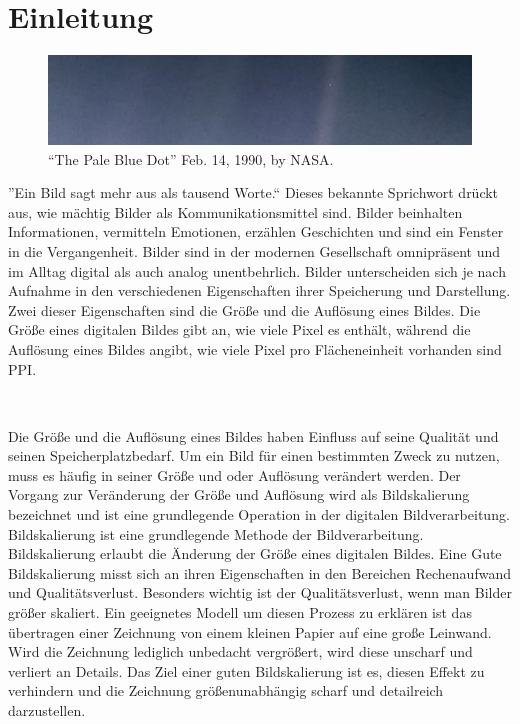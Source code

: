 



\chapter{Einleitung}
    
    \begin{center}
        \begin{figure}[h]
            \includegraphics[width=\textwidth]{img/PIA23645_PaleBlueDotRevisited_1600.jpg}
            \caption{``The Pale Blue Dot'' Feb. 14, 1990, by NASA\footnotemark.}
            \vspace{-6mm}
            \label{fig:my_label}
        \end{figure}
    \end{center}
    
    ''Ein Bild sagt mehr aus als tausend Worte.`` Dieses bekannte Sprichwort drückt aus, wie mächtig Bilder als Kommunikationsmittel sind. 
    Bilder beinhalten Informationen, vermitteln Emotionen, erzählen Geschichten und sind ein Fenster in die Vergangenheit. 
    Bilder sind in der modernen Gesellschaft omnipräsent und im Alltag digital als auch analog unentbehrlich.
    Bilder unterscheiden sich je nach Aufnahme in den verschiedenen Eigenschaften ihrer Speicherung und Darstellung. 
    Zwei dieser Eigenschaften sind die Größe und die Auflösung eines Bildes. 
    Die Größe eines digitalen Bildes gibt an, wie viele Pixel es enthält, während die Auflösung eines Bildes angibt, wie viele Pixel pro Flächeneinheit vorhanden sind \ac{PPI}.

    ~

    Die Größe und die Auflösung eines Bildes haben Einfluss auf seine Qualität und seinen Speicherplatzbedarf.
    Um ein Bild für einen bestimmten Zweck zu nutzen, muss es häufig in seiner Größe und oder Auflösung verändert werden.
    Der Vorgang zur Veränderung der Größe und Auflösung wird als Bildskalierung bezeichnet und ist eine grundlegende Operation in der digitalen Bildverarbeitung.
    Bildskalierung ist eine grundlegende Methode der Bildverarbeitung. Bildskalierung erlaubt die Änderung der Größe eines digitalen Bildes.
    Eine Gute Bildskalierung misst sich an ihren Eigenschaften in den Bereichen Rechenaufwand und Qualitätsverlust.
    Besonders wichtig ist der Qualitätsverlust, wenn man Bilder größer skaliert.
    Ein geeignetes Modell um diesen Prozess zu erklären ist das übertragen einer Zeichnung von einem kleinen Papier auf eine große Leinwand.
    Wird die Zeichnung lediglich unbedacht vergrößert, wird diese unscharf und verliert an Details.
    Das Ziel einer guten Bildskalierung ist es, diesen Effekt zu verhindern und die Zeichnung größenunabhängig scharf und detailreich darzustellen.

